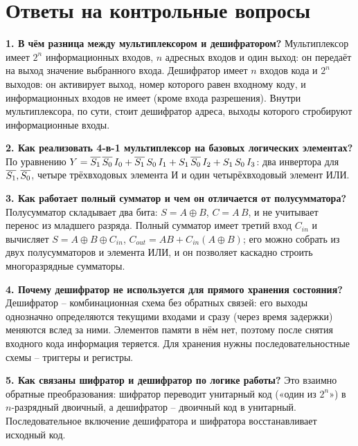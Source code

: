 \documentclass[14pt]{extarticle}
\begin{document}
\section{Ответы на контрольные вопросы}
\textbf{1. В чём разница между мультиплексором и дешифратором?}
Мультиплексор имеет $2^n$ информационных входов, $n$ адресных входов и один выход: он
передаёт на выход значение выбранного входа. Дешифратор имеет $n$ входов кода и $2^n$
выходов: он активирует выход, номер которого равен входному коду, и информационных входов
не имеет (кроме входа разрешения). Внутри мультиплексора, по сути, стоит дешифратор адреса,
выходы которого стробируют информационные входы.

\textbf{2. Как реализовать 4-в-1 мультиплексор на базовых логических элементах?}
По уравнению $Y=\overline{S_1}\,\overline{S_0}\,I_0+\overline{S_1}\,S_0\,I_1+S_1\,\overline{S_0}\,I_2+S_1\,S_0\,I_3$:
два инвертора для $\overline{S_1},\overline{S_0}$, четыре трёхвходовых элемента И и один
четырёхвходовый элемент ИЛИ.

\textbf{3. Как работает полный сумматор и чем он отличается от полусумматора?}
Полусумматор складывает два бита: $S=A\oplus B$, $C=A\,B$, и не учитывает перенос из младшего
разряда. Полный сумматор имеет третий вход $C_{in}$ и вычисляет $S=A\oplus B\oplus C_{in}$,
$C_{out}=AB+C_{in}(A\oplus B)$; его можно собрать из двух полусумматоров и элемента ИЛИ, и
он позволяет каскадно строить многоразрядные сумматоры.

\textbf{4. Почему дешифратор не используется для прямого хранения состояния?}
Дешифратор -- комбинационная схема без обратных связей: его выходы однозначно определяются
текущими входами и сразу (через время задержки) меняются вслед за ними. Элементов памяти в
нём нет, поэтому после снятия входного кода информация теряется. Для хранения нужны
последовательностные схемы -- триггеры и регистры.

\textbf{5. Как связаны шифратор и дешифратор по логике работы?}
Это взаимно обратные преобразования: шифратор переводит унитарный код («один из $2^n$») в
$n$-разрядный двоичный, а дешифратор -- двоичный код в унитарный. Последовательное
включение дешифратора и шифратора восстанавливает исходный код.

\end{document}
